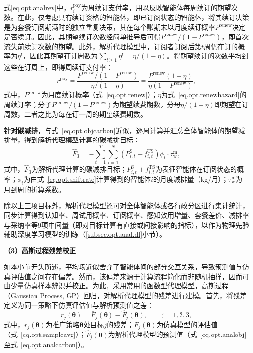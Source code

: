 式\eqref{eq.opt.analrev}中，$r_{i}^{\mathrm{pay}}$为周续订支付率，用以反映智能体每周续订的期望次数。在此，仅考虑具有续订资格的智能体，即已订阅状态的智能体，将其续订决策是为套餐订阅期满时的独立重复决策，其在每个账期末以月度续订概率$P^{\mathrm{renew}}$决定是否续订。因此，其期望续订次数经简单推导后可得$P^{\mathrm{renew}}/\left(1-P^{\mathrm{renew}}\right)$，即首次流失前续订次数的期望。此外，解析代理模型中，订阅者订阅后第$t$周仍在订的概率为$\eta^{t}$，因此其期望在订周数为$\sum_{t\geq 1}\eta^{t}=\eta/\left(1-\eta\right)$。将期望续订的次数平均到这些在订周上，即得周续订支付率：
\begin{equation}
r^{\mathrm{pay}}
= \frac{P^{\mathrm{renew}}/\left(1-P^{\mathrm{renew}}\right)}{\eta/\left(1-\eta\right)}
= \frac{P^{\mathrm{renew}}\left(1-\eta\right)}{\eta\left(1-P^{\mathrm{renew}}\right)},
\label{eq.opt.rpay}
\end{equation}
式中，$P^{\mathrm{renew}}$为月度续订概率（式~\eqref{eq.opt.renew}）；$\eta$为式~\eqref{eq.opt.renewhazard}的周续订率；分子$P^{\mathrm{renew}}/\left(1-P^{\mathrm{renew}}\right)$为期望续费期数，分母$\eta/\left(1-\eta\right)$即期望在订周数，二者之比为每在订一周的期望续费期数。

\textbf{针对碳减排}，与式~\eqref{eq.opt.objcarbon}近似，逐周计算并汇总全体智能体的期望减排量，得到解析代理模型计算的碳减排目标：
\begin{equation}
\hat{F}_{3} = -\sum_{t=1}^{T}\sum_{i=1}^{N}\left(P_{i,t}^{\mathrm{S}}+f_{i,t}^{\mathrm{TS}}\right)\phi_{i}\cdot\tau^{\mathrm{m}} _{\mathrm{w}},
\label{eq.opt.analcarbon}
\end{equation}
式中，$\hat{F}_{3}$为解析代理计算的碳减排目标；$P_{i,t}^{\mathrm{S}}+f_{i,t}^{\mathrm{TS}}$为表征智能体在订阅状态的概率；$\phi_{i}$为由式~\eqref{eq.opt.shiftrate}计算得到的智能体$i$的月度减排量（kg/月）；$\tau^{\mathrm{m}} _{\mathrm{w}}$为月到周的折算系数。

除以上三项目标外，解析代理模型还可对全体智能体或各行政分区进行集计统计，同步计算得到认知率、周试用概率、订阅概率、感知效用增量、套餐差价、减排率与采纳率等9项中间量（即对目标计算有直接或间接影响的指标），以作为物理先验辅助深度学习模型的训练（\ref{subsec.opt.anal.dl}小节）。

\textbf{（3）高斯过程残差校正}

如本小节开头所述，平均场近似舍弃了智能体间的部分交互关系，导致预测值与仿真评估值之间存在偏差。然而，该偏差来源于计算流程简化而非随机抽样，因而可由少量仿真样本辨识并校正。为此，采用常用的函数型代理模型，高斯过程（Gaussian Process, GP）回归，对解析代理模型的残差进行建模\citep{rasmussenGaussianProcessesMachine2005}。首先，将残差定义为同一策略下仿真评估值与解析预测值之差：
\begin{equation}
r_{j}\left(\bm{\theta}\right)=\bar{F}_{j}\left(\bm{\theta}\right)-\hat{F}_{j}\left(\bm{\theta}\right),\qquad j=1,2,3,
\label{eq.opt.residual}
\end{equation}
式中，$r_{j}\left(\bm{\theta}\right)$为推广策略$\bm{\theta}$处目标$j$的残差；$\bar{F}_{j}\left(\bm{\theta}\right)$为仿真模型的评估值（式~\eqref{eq.opt.sampleavg}）；$\hat{F}_{j}\left(\bm{\theta}\right)$为解析代理模型的预测值（式~\eqref{eq.opt.analobj}至式~\eqref{eq.opt.analcarbon}）。


